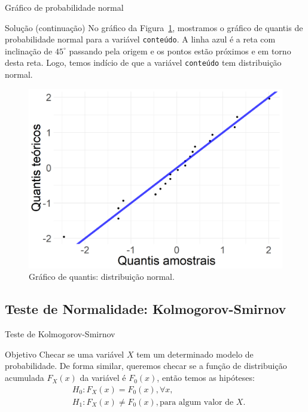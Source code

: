 \documentclass[10pt]{beamer}
\begin{document}
\begin{frame}{Gráfico de probabilidade normal}

\begin{block}{Solução (continuação)}
No gráfico da Figura~\ref{fig:qqnorm}, mostramos o gráfico de quantis de probabilidade normal para a variável \texttt{conteúdo}. A linha azul é a reta com inclinação de $45^\circ$ passando pela origem e os pontos estão próximos e em torno desta reta. Logo, temos indício de que a variável \texttt{conteúdo} tem distribuição normal.
\begin{figure}[htbp]
	\centering
	\caption{Gráfico de quantis: distribuição normal.}
	\label{fig:qqnorm}
	\includegraphics[width=0.4\linewidth]{figures/qqnorm.png}
\end{figure}	
\end{block}

\end{frame}

\subsection{Teste de Normalidade: Kolmogorov-Smirnov}

\begin{frame}{Teste de Kolmogorov-Smirnov}
	\begin{block}{Objetivo}
		Checar se uma variável $X$ tem um determinado modelo de probabilidade. De forma similar, queremos checar se a função de distribuição acumulada $F_X(x)$ da variável é  $F_0(x)$, então temos as hipóteses:
		\begin{align*}
			&H_0: F_X(x)=F_0(x), \forall x,\\
			&H_1: F_X(x) \neq F_0(x), \mbox{para algum valor de }X.
		\end{align*}
	\end{block}

\end{frame}
\end{document}
